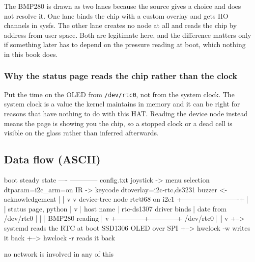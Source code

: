 The BMP280 is drawn as two lanes because the source gives a choice and does not resolve it. One lane binds the chip with a custom overlay and gets IIO channels in sysfs. The other lane creates no node at all and reads the chip by address from user space. Both are legitimate here, and the difference matters only if something later has to depend on the pressure reading at boot, which nothing in this book does.

\subsubsection*{Why the status page reads the chip rather than the clock}

Put the time on the OLED from \texttt{/dev/rtc0}, not from the system clock. The system clock is a value the kernel maintains in memory and it can be right for reasons that have nothing to do with this HAT. Reading the device node instead means the page is showing you the chip, so a stopped clock or a dead cell is visible on the glass rather than inferred afterwards.

\subsection*{Data flow (ASCII)}

\begin{asciiart}
  boot                                     steady state
  ----                                     ------------
  config.txt                               joystick -> menu selection
    dtparam=i2c_arm=on                     IR       -> keycode
    dtoverlay=i2c-rtc,ds3231               buzzer   <- acknowledgement
       |                                       |
       v                                       v
  device-tree node rtc@68 on i2c1          +-------------------------+
       |                                   |  status page, python    |
       v                                   |    host name            |
  rtc-ds1307 driver binds                  |    date from /dev/rtc0  |
       |                                   |    BMP280 reading       |
       v                                   +------------+------------+
  /dev/rtc0                                             |
       |                                                v
       +--> systemd reads the RTC at boot        SSD1306 OLED over SPI
       +--> hwclock -w writes it back
       +--> hwclock -r reads it back

  no network is involved in any of this
\end{asciiart}

